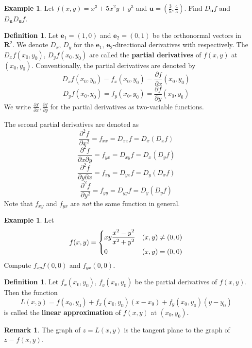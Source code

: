 \documentclass[t]{beamer}
\theoremstyle{plain}
\theoremstyle{definition}
\newtheorem{defn}[thm]{Definition}
\newtheorem{exmp}[thm]{Example}
\newtheorem{rem}[thm]{Remark}
\begin{document}
\begin{frame}
\begin{exmp}
	Let $f(x,y)=x^3+5x^2y+y^3$ 
	and $\mathbf u=(\frac{3}{5},\frac{4}{5})$.
	Find $D_{\mathbf u}f$ and 
	$D_{\mathbf u}D_{\mathbf u} f$.
\end{exmp}
\end{frame}

\begin{frame}	
\begin{defn}
	Let $\mathbf e_1=(1,0)$ and $\mathbf e_2=(0,1)$ 
	be the orthonormal vectors in $\mathbf R^2$.
	We denote $D_x$, $D_y$ for the 
	$\mathbf e_1$, $\mathbf e_2$-directional derivatives
	with respectively.
	The $D_xf(x_0,y_0)$, $D_yf(x_0,y_0)$ are called 
	the \textbf{partial derivatives} of $f(x,y)$ 
	at $(x_0,y_0)$.
	Conventionally, the partial derivatives are 
	denoted by
	$$D_xf(x_0,y_0) = f_x(x_0,y_0)
	 = \frac{\partial f}{\partial x}(x_0,y_0)$$
	$$D_yf(x_0,y_0) = f_y(x_0,y_0)
	 = \frac{\partial f}{\partial y}(x_0,y_0)$$
	We write $\displaystyle 
	\frac{\partial f}{\partial x},
	\frac{\partial f}{\partial y}$ 
	for the partial derivatives as 
	two-variable functions.
\end{defn}
\end{frame}

\begin{frame}
The second partial derivatives are denoted as
	$$\frac{\partial^2f}{\partial x^2}
	 = f_{xx}=D_{xx}f=D_x(D_xf)$$
	$$\frac{\partial^2f}{\partial x\partial y}
	 = f_{yx}=D_{xy}f=D_x(D_yf)$$
	$$\frac{\partial^2f}{\partial y\partial x}
	 = f_{xy}=D_{yx}f=D_y(D_xf)$$
	$$\frac{\partial^2f}{\partial y^2}=f_{yy}
	 = D_{yy}f=D_y(D_yf)$$
Note that $f_{xy}$ and $f_{yx}$ are \emph{not}
the same function in general.
\end{frame}

\begin{frame}
\begin{exmp}
Let 
	$$f(x,y)=\begin{dcases}
	xy\frac{x^2-y^2}{x^2+y^2}&(x,y)\neq(0,0)\\
	0& (x,y)=(0,0)
	\end{dcases}$$
Compute $f_{xy}f(0,0)$ and $f_{yx}(0,0)$.
\end{exmp}
\end{frame}

\begin{frame}
\begin{defn}
	Let $f_x(x_0,y_0)$, $f_y(x_0,y_0)$ 
	be the partial derivatives of $f(x,y)$.
	Then the function
	$$L(x,y) = f(x_0,y_0) + f_x(x_0,y_0)(x-x_0)
		+ f_y(x_0,y_0)(y-y_0)$$
	is called the \textbf{linear approximation} of 
	$f(x,y)$ at $(x_0,y_0)$.
\end{defn}
\begin{rem}
	The graph of $z=L(x,y)$ is the tangent plane
	to the graph of $z=f(x,y)$.
\end{rem}
\end{frame}
\end{document}
